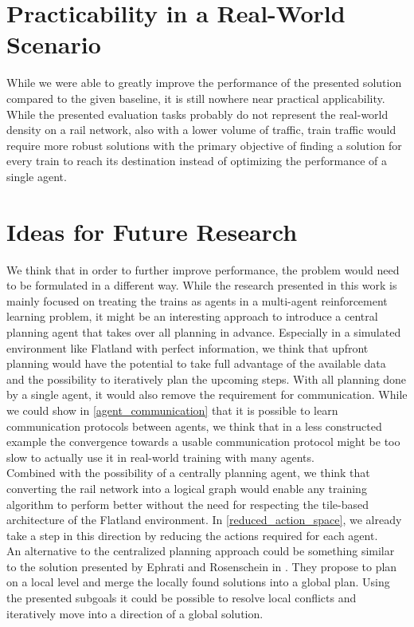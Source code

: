 \section{Practicability in a Real-World Scenario}\label{discussion_real_world}
While we were able to greatly improve the performance of the presented solution compared to the given baseline, it is still nowhere near practical applicability. While the presented evaluation tasks probably do not represent the real-world density on a rail network, also with a lower volume of traffic, train traffic would require more robust solutions with the primary objective of finding a solution for every train to reach its destination instead of optimizing the performance of a single agent.

\section{Ideas for Future Research}\label{discussion_research}
We think that in order to further improve performance, the problem would need to be formulated in a different way. While the research presented in this work is mainly focused on treating the trains as agents in a multi-agent reinforcement learning problem, it might be an interesting approach to introduce a central planning agent that takes over all planning in advance. Especially in a simulated environment like Flatland with perfect information, we think that upfront planning would have the potential to take full advantage of the available data and the possibility to iteratively plan the upcoming steps. With all planning done by a single agent, it would also remove the requirement for communication. While we could show in \autoref{agent_communication} that it is possible to learn communication protocols between agents, we think that in a less constructed example the convergence towards a usable communication protocol might be too slow to actually use it in real-world training with many agents.\\
Combined with the possibility of a centrally planning agent, we think that converting the rail network into a logical graph would enable any training algorithm to perform better without the need for respecting the tile-based architecture of the Flatland environment. In \autoref{reduced_action_space}, we already take a step in this direction by reducing the actions required for each agent.\\
An alternative to the centralized planning approach could be something similar to the solution presented by Ephrati and Rosenschein in \cite{Ephrati1993MultiAgentPA}. They propose to plan on a local level and merge the locally found solutions into a global plan. Using the presented subgoals it could be possible to resolve local conflicts and iteratively move into a direction of a global solution.